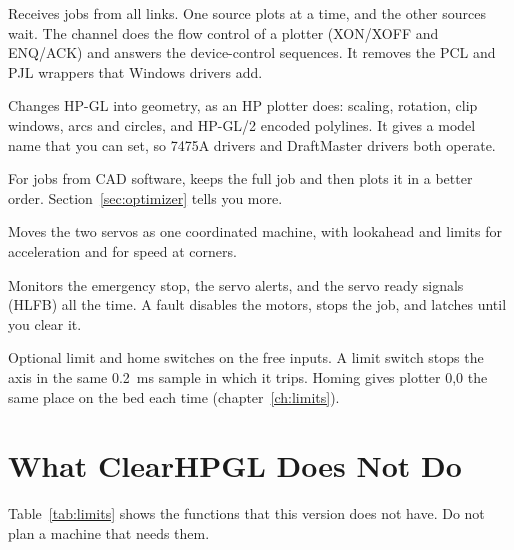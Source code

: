 \begin{description}[style=nextline,leftmargin=1.2em,font=\sffamily\bfseries\color{navy}]
  \item[Input channel] Receives jobs from all links. One source plots at a
        time, and the other sources wait. The channel does the flow control
        of a plotter (XON/XOFF and ENQ/ACK) and answers the 
        device-control sequences. It removes the PCL and PJL wrappers that
        Windows drivers add.
  \item[HP-GL interpreter] Changes HP-GL into geometry, as an HP plotter
        does: scaling, rotation, clip windows, arcs and circles, and HP-GL/2
        encoded polylines. It gives a model name that you can set, so 7475A
        drivers and DraftMaster drivers both operate.
  \item[Job optimizer] For jobs from CAD software, keeps the full job and
        then plots it in a better order. Section~\ref{sec:optimizer} tells
        you more.
  \item[Motion planner] Moves the two servos as one coordinated machine,
        with lookahead and limits for acceleration and for speed at corners.
  \item[Safety] Monitors the emergency stop, the servo alerts, and the servo
        ready signals (HLFB) all the time. A fault disables the motors, stops
        the job, and latches until you clear it.
  \item[Limits and homing] Optional limit and home switches on the free
        inputs. A limit switch stops the axis in the same 0.2~ms sample in
        which it trips. Homing gives plotter 0,0 the same place on the bed
        each time (chapter~\ref{ch:limits}).
\end{description}

\section{What ClearHPGL Does Not Do}\label{sec:limits}

Table~\ref{tab:limits} shows the functions that this version does not have.
Do not plan a machine that needs them.

